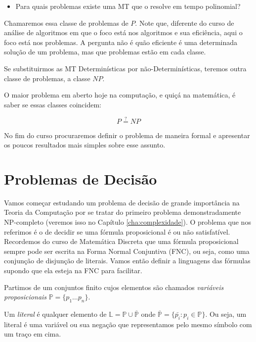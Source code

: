 \begin{itemize}
\item Para quais problemas existe uma MT que o resolve em tempo polinomial?
\end{itemize}

Chamaremos essa classe de problemas de $P$.
Note que, diferente do curso de análise de algoritmos em que o foco está nos algoritmos e sua eficiência, aqui o foco está nos problemas.
A pergunta não é quão eficiente é uma determinada solução de um problema, mas que problemas estão em cada classe.

Se substituirmos as MT Determinísticas por não-Determinísticas, teremos outra classe de problemas, a classe $NP$.

O maior problema em aberto hoje na computação, e quiçá na matemática, é saber se essas classes coincidem:

\begin{displaymath}
  P \stackrel{?}{=} NP
\end{displaymath}

No fim do curso procuraremos definir o problema de maneira formal e apresentar os poucos resultados mais simples sobre esse assunto.

\section{Problemas de Decisão}
\label{sec:problemas}

Vamos começar estudando um problema de decisão de grande importância na Teoria da Computação por se tratar do primeiro problema demonstradamente NP-completo (veremos isso no Capítulo \ref{cha:complexidade}).
O problema que nos referimos é o de decidir se uma fórmula proposicional é ou não satisfatível.
Recordemos do curso de Matemática Discreta que uma fórmula proposicional sempre pode ser escrita na Forma Normal Conjuntiva (FNC), ou seja, como uma conjunção de disjunção de literais.
Vamos então definir a linguagens das fórmulas supondo que ela esteja na FNC para facilitar.

Partimos de um conjuntos finito cujos elementos são chamados {\em variáveis proposicionais} $\mathbb{P} = \{p_1 \dots p_n\}$.

Um {\em literal} é qualquer elemento de $\mathbb{L} = \mathbb{P} \cup \overline{\mathbb{P}}$ onde $\overline{\mathbb{P}} = \{\bar{p_i}: p_i \in \mathbb{P}\}$.
Ou seja, um literal é uma variável ou sua negação que representamos pelo mesmo símbolo com um traço em cima.

